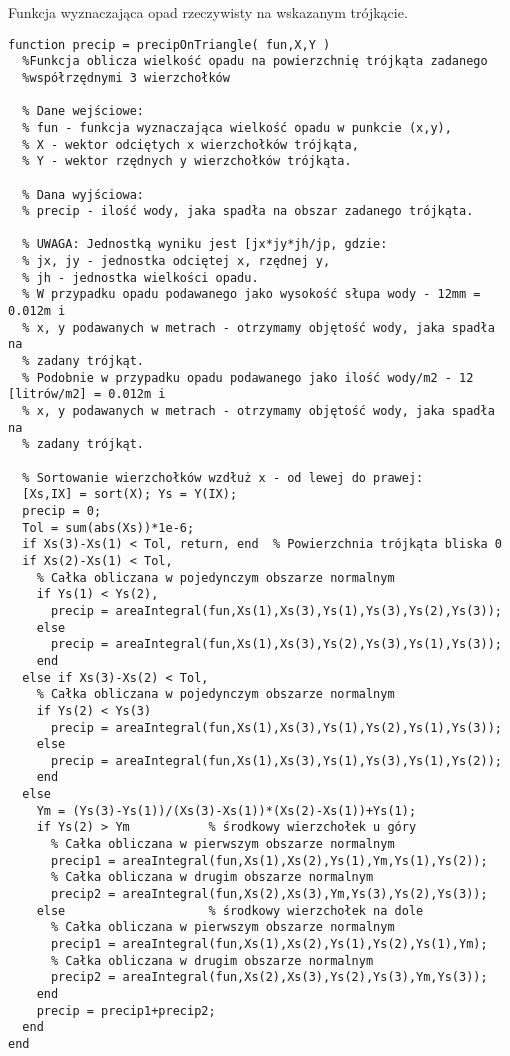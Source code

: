 Funkcja wyznaczająca opad rzeczywisty na wskazanym trójkącie.
\begin{lstlisting}
function precip = precipOnTriangle( fun,X,Y )
  %Funkcja oblicza wielkość opadu na powierzchnię trójkąta zadanego
  %współrzędnymi 3 wierzchołków

  % Dane wejściowe:
  % fun - funkcja wyznaczająca wielkość opadu w punkcie (x,y),
  % X - wektor odciętych x wierzchołków trójkąta,
  % Y - wektor rzędnych y wierzchołków trójkąta.

  % Dana wyjściowa:
  % precip - ilość wody, jaka spadła na obszar zadanego trójkąta.

  % UWAGA: Jednostką wyniku jest [jx*jy*jh/jp, gdzie:
  % jx, jy - jednostka odciętej x, rzędnej y,
  % jh - jednostka wielkości opadu.
  % W przypadku opadu podawanego jako wysokość słupa wody - 12mm = 0.012m i
  % x, y podawanych w metrach - otrzymamy objętość wody, jaka spadła na
  % zadany trójkąt.
  % Podobnie w przypadku opadu podawanego jako ilość wody/m2 - 12 [litrów/m2] = 0.012m i
  % x, y podawanych w metrach - otrzymamy objętość wody, jaka spadła na
  % zadany trójkąt.

  % Sortowanie wierzchołków wzdłuż x - od lewej do prawej:
  [Xs,IX] = sort(X); Ys = Y(IX);
  precip = 0;
  Tol = sum(abs(Xs))*1e-6; 
  if Xs(3)-Xs(1) < Tol, return, end  % Powierzchnia trójkąta bliska 0
  if Xs(2)-Xs(1) < Tol,
    % Całka obliczana w pojedynczym obszarze normalnym
    if Ys(1) < Ys(2),
      precip = areaIntegral(fun,Xs(1),Xs(3),Ys(1),Ys(3),Ys(2),Ys(3));
    else
      precip = areaIntegral(fun,Xs(1),Xs(3),Ys(2),Ys(3),Ys(1),Ys(3)); 
    end
  else if Xs(3)-Xs(2) < Tol,
    % Całka obliczana w pojedynczym obszarze normalnym
    if Ys(2) < Ys(3)
      precip = areaIntegral(fun,Xs(1),Xs(3),Ys(1),Ys(2),Ys(1),Ys(3));
    else
      precip = areaIntegral(fun,Xs(1),Xs(3),Ys(1),Ys(3),Ys(1),Ys(2));
    end
  else 
    Ym = (Ys(3)-Ys(1))/(Xs(3)-Xs(1))*(Xs(2)-Xs(1))+Ys(1);
    if Ys(2) > Ym           % środkowy wierzchołek u góry
      % Całka obliczana w pierwszym obszarze normalnym
      precip1 = areaIntegral(fun,Xs(1),Xs(2),Ys(1),Ym,Ys(1),Ys(2));    
      % Całka obliczana w drugim obszarze normalnym
      precip2 = areaIntegral(fun,Xs(2),Xs(3),Ym,Ys(3),Ys(2),Ys(3));
    else                    % środkowy wierzchołek na dole
      % Całka obliczana w pierwszym obszarze normalnym
      precip1 = areaIntegral(fun,Xs(1),Xs(2),Ys(1),Ys(2),Ys(1),Ym);    
      % Całka obliczana w drugim obszarze normalnym
      precip2 = areaIntegral(fun,Xs(2),Xs(3),Ys(2),Ys(3),Ym,Ys(3));
    end
    precip = precip1+precip2;
  end
end
\end{lstlisting}








